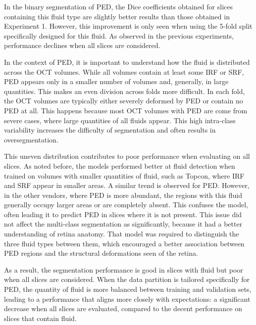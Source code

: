 In the binary segmentation of PED, the Dice coefficients obtained for slices containing this fluid type are slightly better results than those obtained in Experiment 1. However, this improvement is only seen when using the 5-fold split specifically designed for this fluid. As observed in the previous experiments, performance declines when all slices are considered.
\par
In the context of PED, it is important to understand how the fluid is distributed across the OCT volumes. While all volumes contain at least some IRF or SRF, PED appears only in a smaller number of volumes and, generally, in large quantities. This makes an even division across folds more difficult. In each fold, the OCT volumes are typically either severely deformed by PED or contain no PED at all. This happens because most OCT volumes with PED are come from severe cases, where large quantities of all fluids appear. This high intra-class variability increases the difficulty of segmentation and often results in oversegmentation.
\par
This uneven distribution contributes to poor performance when evaluating on all slices. As noted before, the models performed better at fluid detection when trained on volumes with smaller quantities of fluid, such as Topcon, where IRF and SRF appear in smaller areas. A similar trend is observed for PED. However, in the other vendors, where PED is more abundant, the regions with this fluid generally occupy larger areas or are completely absent. This confuses the model, often leading it to predict PED in slices where it is not present. This issue did not affect the multi-class segmentation as significantly, because it had a better understanding of retina anatomy. That model was required to distinguish the three fluid types between them, which encouraged a better association between PED regions and the structural deformations seen of the retina.
\par
As a result, the segmentation performance is good in slices with fluid but poor when all slices are considered. When the data partition is tailored specifically for PED, the quantity of fluid is more balanced between training and validation sets, leading to a performance that aligns more closely with expectations: a significant decrease when all slices are evaluated, compared to the decent performance on slices that contain fluid. 
\par
